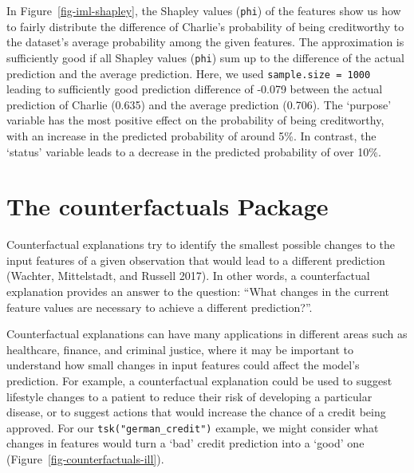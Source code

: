 In Figure~\ref{fig-iml-shapley}, the Shapley values (\texttt{phi}) of
the features show us how to fairly distribute the difference of
Charlie's probability of being creditworthy to the dataset's average
probability among the given features. The approximation is sufficiently
good if all Shapley values (\texttt{phi}) sum up to the difference of
the actual prediction and the average prediction. Here, we used
\texttt{sample.size\ =\ 1000} leading to sufficiently good prediction
difference of -0.079 between the actual prediction of Charlie (0.635)
and the average prediction (0.706). The `purpose' variable has the most
positive effect on the probability of being creditworthy, with an
increase in the predicted probability of around 5\%. In contrast, the
`status' variable leads to a decrease in the predicted probability of
over 10\%.

\hypertarget{sec-counterfactuals}{%
\section{The counterfactuals Package}\label{sec-counterfactuals}}

Counterfactual
explanations try to identify the smallest possible changes to the input
features of a given observation that would lead to a different
prediction (Wachter, Mittelstadt, and Russell 2017). In other words, a
counterfactual explanation provides an answer to the question: ``What
changes in the current feature values are necessary to achieve a
different prediction?''.

Counterfactual explanations can have many applications in different
areas such as healthcare, finance, and criminal justice, where it may be
important to understand how small changes in input features could affect
the model's prediction. For example, a counterfactual explanation could
be used to suggest lifestyle changes to a patient to reduce their risk
of developing a particular disease, or to suggest actions that would
increase the chance of a credit being approved. For our
\texttt{tsk("german\_credit")} example, we might consider what changes
in features would turn a `bad' credit prediction into a `good' one
(Figure~\ref{fig-counterfactuals-ill}).

